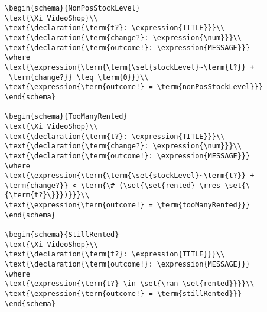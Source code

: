 \begin{verbatim}
\begin{schema}{NonPosStockLevel}
\text{\Xi VideoShop}\\
\text{\declaration{\term{t?}: \expression{TITLE}}}\\
\text{\declaration{\term{change?}: \expression{\num}}}\\
\text{\declaration{\term{outcome!}: \expression{MESSAGE}}}
\where
\text{\expression{\term{\term{\set{stockLevel}~\term{t?}} +
 \term{change?}} \leq \term{0}}}\\
\text{\expression{\term{outcome!} = \term{nonPosStockLevel}}}
\end{schema}

\begin{schema}{TooManyRented}
\text{\Xi VideoShop}\\
\text{\declaration{\term{t?}: \expression{TITLE}}}\\
\text{\declaration{\term{change?}: \expression{\num}}}\\
\text{\declaration{\term{outcome!}: \expression{MESSAGE}}}
\where
\text{\expression{\term{\term{\set{stockLevel}~\term{t?}} + 
\term{change?}} < \term{\# (\set{\set{rented} \rres \set{\{\term{t?}\}}})}}}\\
\text{\expression{\term{outcome!} = \term{tooManyRented}}}
\end{schema}

\begin{schema}{StillRented}
\text{\Xi VideoShop}\\
\text{\declaration{\term{t?}: \expression{TITLE}}}\\
\text{\declaration{\term{outcome!}: \expression{MESSAGE}}}
\where
\text{\expression{\term{t?} \in \set{\ran \set{rented}}}}\\
\text{\expression{\term{outcome!} = \term{stillRented}}}
\end{schema}


\end{verbatim}